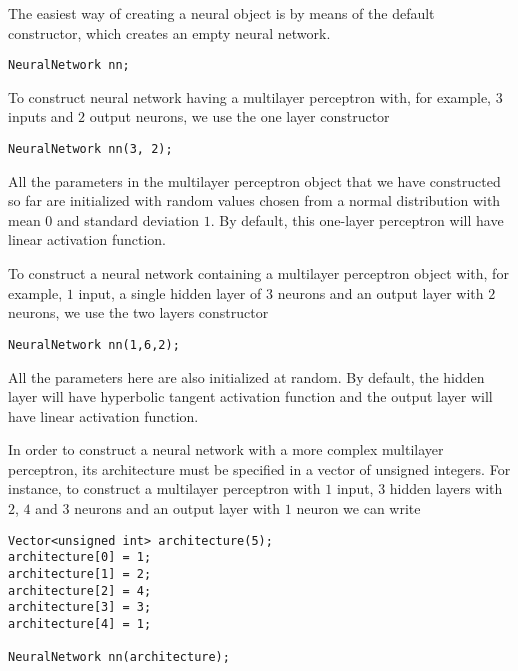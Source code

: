 
The easiest way of creating a neural object is by means of the default constructor, which creates an empty neural network. 

\begin{lstlisting}
NeuralNetwork nn;
\end{lstlisting}


To construct neural network having a multilayer perceptron with, for example, $3$
inputs and $2$ output neurons, we use the one layer constructor

\begin{lstlisting}
NeuralNetwork nn(3, 2);
\end{lstlisting}

All the parameters in the multilayer perceptron object that
we have constructed so far are initialized with random values chosen
from a normal distribution with mean $0$ and standard deviation $1$.
By default, this one-layer perceptron will have linear activation function.


To construct a neural network containing a multilayer perceptron object with, for example, $1$
input, a single hidden layer of $3$ neurons and an output layer with
$2$ neurons, we use the two layers constructor

\begin{lstlisting}
NeuralNetwork nn(1,6,2);
\end{lstlisting}

All the parameters here are also initialized at random. 
By default, the hidden layer will have hyperbolic tangent activation function 
and the output layer will have linear activation function.


In order to construct a neural network with a more complex multilayer perceptron,
its architecture must be specified in a vector of unsigned integers. 
For instance, to construct a multilayer
perceptron with $1$ input, $3$ hidden layers with $2$, $4$ and $3$ neurons and
an output layer with $1$ neuron we can write

\begin{lstlisting}
Vector<unsigned int> architecture(5);
architecture[0] = 1;
architecture[1] = 2;
architecture[2] = 4;
architecture[3] = 3;
architecture[4] = 1;

NeuralNetwork nn(architecture);
\end{lstlisting}

